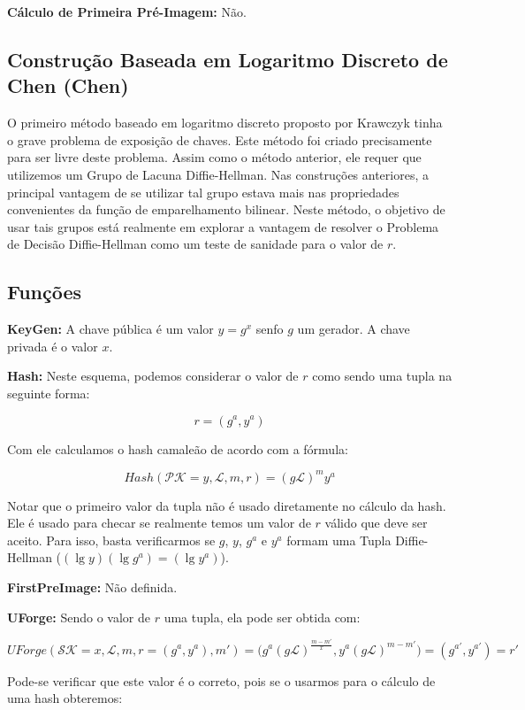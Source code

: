 \documentclass[a4paper]{article}
\begin{document}
\textbf{Cálculo de Primeira Pré-Imagem: }Não.

\subsection{Construção Baseada em Logaritmo Discreto de Chen (Chen)
  \cite{chen}}

O primeiro método baseado em logaritmo discreto proposto por Krawczyk
tinha o grave problema de exposição de chaves. Este método foi criado
precisamente para ser livre deste problema. Assim como o método
anterior, ele requer que utilizemos um Grupo de Lacuna
Diffie-Hellman. Nas construções anteriores, a principal vantagem de se
utilizar tal grupo estava mais nas propriedades convenientes da função
de emparelhamento bilinear. Neste método, o objetivo de usar tais
grupos está realmente em explorar a vantagem de resolver o Problema de
Decisão Diffie-Hellman como um teste de sanidade para o valor de $r$.

\subsection{Funções}

\textbf{KeyGen: }A chave pública é um valor $y=g^x$ senfo $g$ um
gerador. A chave privada é o valor $x$.

\textbf{Hash: }Neste esquema, podemos considerar o valor de $r$ como
sendo uma tupla na seguinte forma:

$$
r = (g^a, y^a)
$$

Com ele calculamos o hash camaleão de acordo com a fórmula:

$$
Hash(\mathcal{PK}=y, \mathcal{L}, m, r) = (g\mathcal{L})^my^a
$$

Notar que o primeiro valor da tupla não é usado diretamente no cálculo
da hash. Ele é usado para checar se realmente temos um valor de $r$
válido que deve ser aceito. Para isso, basta verificarmos se $g$, $y$,
$g^a$ e $y^a$ formam uma Tupla Diffie-Hellman ($(\lg y)(\lg g^a) =(\lg
y^a)$).

\textbf{FirstPreImage:} Não definida.

\textbf{UForge:} Sendo o valor de $r$ uma tupla, ela pode ser obtida
com:

$$UForge(\mathcal{SK}=x, \mathcal{L}, m, r=(g^a,y^a), m') =
\big(g^a(g\mathcal{L})^{\frac{m-m'}{x}}, y^a(g\mathcal{L})^{m-m'}\big) =
(g^{a'}, y^{a'}) = r'
$$

Pode-se verificar que este valor é o correto, pois se o usarmos para o
cálculo de uma hash obteremos:
\end{document}
